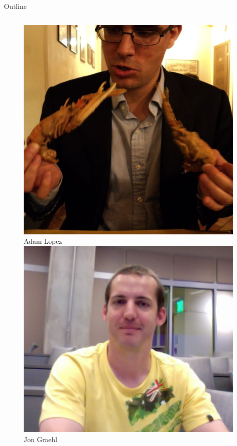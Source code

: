 \documentclass{beamer}
\begin{document}
\begin{frame}[t]{Outline}
\begin{columns}
\begin{column}{0.2\textwidth}
\begin{exampleblock}{}
\begin{figure}
        {\centering \includegraphics[scale=0.06]{adam.jpg}} \\
        Adam Lopez\\
        
        {\centering \includegraphics[scale=0.10]{jon.pdf}} \\
        Jon Graehl\\
        

\end{figure}
\end{exampleblock}
\end{column}
\end{columns}
\end{frame}
\end{document}
